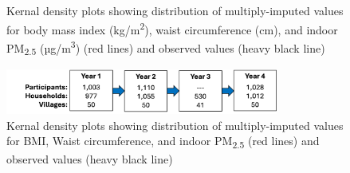 \documentclass[
  letterpaper,
  DIV=11,
  numbers=noendperiod]{scrartcl}
\begin{document}
\begin{figure}
\begin{minipage}[t]{0.50\linewidth}
{\centering 


}

\subcaption{\label{fig-afig-mi-3}}
\end{minipage}%

\caption{\label{fig-afig-mi}Kernal density plots showing distribution of
multiply-imputed values for body mass index (kg/m\textsuperscript{2}),
waist circumference (cm), and indoor PM\textsubscript{2.5}
(µg/m\textsuperscript{3}) (red lines) and observed values (heavy black
line)}

\end{figure}

\begin{figure}[H]

{\centering \includegraphics[width=0.8\textwidth,height=\textheight]{images/Participation-flowchart-Apr12.png}

}

\caption{\label{fig-flowchart}Kernal density plots showing distribution
of multiply-imputed values for BMI, Waist circumference, and indoor
PM\textsubscript{2.5} (red lines) and observed values (heavy black
line)}

\end{figure}
\end{document}
